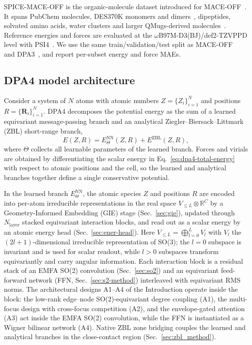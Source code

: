 SPICE-MACE-OFF is the organic-molecule dataset introduced for MACE-OFF~\cite{kovacs2023mace}.
It spans PubChem molecules, DES370K monomers and dimers~\cite{donchev2021des370k}, dipeptides, solvated amino acids, water clusters and larger QMugs-derived molecules~\cite{eastman2023spice,isert2022qmugs}.
Reference energies and forces are evaluated at the $\omega$B97M-D3(BJ)/def2-TZVPPD level with PSI4~\cite{najibi2018nonlocal,grimme2010consistent,grimme2011effect,weigend2005balanced,rappoport2010property,smith2020psi4}.
We use the same train/validation/test split as MACE-OFF~\cite{kovacs2023mace} and DPA3~\cite{zhang2025dpa3}, and report per-subset energy and force MAEs.

\subsection{DPA4 model architecture}

Consider a system of $N$ atoms with atomic numbers $Z=\{Z_i\}_{i=1}^{N}$ and positions $R=\{\mathbf{R}_i\}_{i=1}^{N}$.
DPA4 decomposes the potential energy
as the sum of a learned equivariant message-passing branch and an analytical
Ziegler--Biersack--Littmark (ZBL) short-range branch,
\begin{equation}
    E(Z,R)=E_{\Theta}^{\mathrm{NN}}(Z,R) + E^{\mathrm{ZBL}}(Z,R), \label{eq:dpa4-total-energy} \end{equation} where $\Theta$ collects all learnable parameters of the learned branch.
Forces and virials are obtained by differentiating the scalar energy in Eq.~\eqref{eq:dpa4-total-energy} with respect to atomic positions and the cell, so the learned and analytical branches together define a single conservative potential.

In the learned branch $E_{\Theta}^{\mathrm{NN}}$, the atomic species $Z$ and positions $R$ are encoded into per-atom irreducible representations in the real space $V_{\leq L}\otimes\mathbb{R}^{C}$ by a Geometry-Informed Embedding (GIE) stage (Sec.~\ref{sec:gie}), updated through $N_{\mathrm{layer}}$ stacked equivariant interaction blocks, and read out as a scalar energy by an atomic energy head (Sec.~\ref{sec:ener-head}).
Here $V_{\leq L}=\bigoplus_{l=0}^{L}V_l$ with $V_l$ the $(2l+1)$-dimensional irreducible representation of SO(3); the $l=0$ subspace is invariant and is used for scalar readout, while $l>0$ subspaces transform equivariantly and carry angular information.
Each interaction block is a residual stack of an EMFA SO(2) convolution (Sec.~\ref{sec:so2}) and an equivariant feed-forward network (FFN, Sec.~\ref{sec:s2-method}) interleaved with equivariant RMS norms.
The architectural designs A1--A4 of the Introduction operate inside the block: the low-rank edge--node SO(2)-equivariant degree coupling (A1), the multi-focus design with cross-focus competition (A2), and the envelope-gated attention (A3) act inside the EMFA SO(2) convolution, while the FFN is instantiated as a Wigner bilinear network (A4).
Native ZBL zone bridging couples the learned and analytical branches in the close-contact region (Sec.~\ref{sec:zbl_method}).

